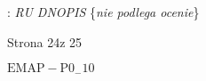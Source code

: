 \documentclass[a4paper,12pt]{article}
\begin{document}
: {\it RU DNOPIS} \{{\it nie podlega ocenie}\}

Strona 24z 25

$\mathrm{E}\mathrm{M}\mathrm{A}\mathrm{P}-\mathrm{P}0_{-}10$
\end{document}
